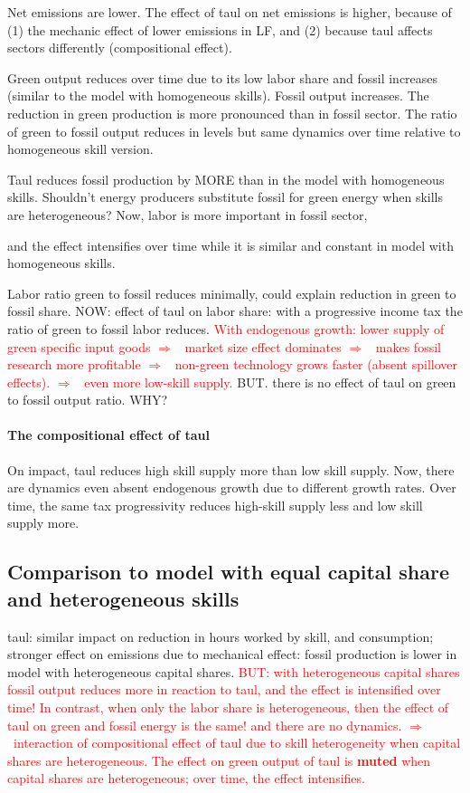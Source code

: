 \documentclass[12pt]{article}
\newcommand{\ar}{$\Rightarrow$ \ }
\newcommand{\tr}[1]{\textcolor{red}{#1}}
\begin{document}
Net emissions are lower. The effect of taul on net emissions is higher, because of (1) the mechanic effect of lower emissions in LF, and (2) because taul affects sectors differently (compositional effect). 

Green output reduces over time due to its low labor share and fossil increases (similar to the model with homogeneous skills). 
Fossil output increases. The reduction in green production is more pronounced than in fossil sector. The ratio of green to fossil output reduces in levels but same dynamics over time relative to homogeneous skill version. 

Taul reduces fossil production by MORE than in the model with homogeneous skills. 
Shouldn't energy producers substitute fossil for green energy when skills are heterogeneous? Now, labor is more important in fossil sector, 

 and the effect intensifies over time while it is similar and constant in model with homogeneous skills. 

Labor ratio green to fossil reduces minimally, could explain reduction in green to fossil share. NOW: effect of taul on labor share: with a progressive income tax the ratio of green to fossil labor reduces. \tr{With endogenous growth: lower supply of green specific input goods \ar market size effect dominates \ar makes fossil research more profitable \ar non-green technology grows faster (absent spillover effects). \ar even more low-skill supply. } BUT. there is no effect of taul on green to fossil output ratio. WHY? 

\paragraph{The compositional effect of taul} On impact, taul reduces high skill supply more than low skill supply. Now, there are dynamics even absent endogenous growth due to different growth rates. Over time, the same tax progressivity reduces high-skill supply less and low skill supply more. 



\subsection{Comparison to model with equal capital share and heterogeneous skills}
taul: similar impact on reduction in hours worked by skill, and consumption; stronger effect on emissions due to mechanical effect: fossil production is lower in model with heterogeneous capital shares. \tr{BUT: with heterogeneous capital shares fossil output reduces more in reaction to taul, and the effect is intensified over time! In contrast, when only the labor share is heterogeneous, then the effect of taul on green and fossil energy is the same! and there are no dynamics. \ar interaction of compositional effect of taul due to skill heterogeneity when capital shares are heterogeneous. The effect on green output of taul is \textbf{muted} when capital shares are heterogeneous; over time, the effect intensifies. }
\end{document}

